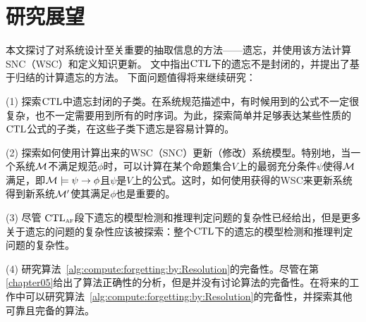 \section{研究展望}
本文探讨了对系统设计至关重要的抽取信息的方法——遗忘，并使用该方法计算SNC（WSC）和定义知识更新。
文中指出$\textrm{CTL}$下的遗忘不是封闭的，并提出了基于归结的计算遗忘的方法。
下面问题值得将来继续研究：

(1) 探索$\textrm{CTL}$中遗忘封闭的子类。在系统规范描述中，有时候用到的公式不一定很复杂，也不一定需要用到所有的时序词。为此，探索简单并足够表达某些性质的$\textrm{CTL}$公式的子类，在这些子类下遗忘是容易计算的。

(2) 探索如何使用计算出来的WSC（SNC）更新（修改）系统模型。特别地，当一个系统$\cal M$不满足规范$\phi$时，可以计算在某个命题集合$V$上的最弱充分条件$\psi$使得${\cal M}$满足，即${\cal M}\models\psi\rightarrow \phi$且$\psi$是$V$上的公式。这时，如何使用获得的WSC来更新系统得到新系统${\cal M}'$使其满足$\phi$也是重要的。


(3) 尽管 $\textrm{CTL}_{\textsc{a}\textsc{f}}$段下遗忘的模型检测和推理判定问题的复杂性已经给出，但是更多关于遗忘的问题的复杂性应该被探索：整个$\textrm{CTL}$下的遗忘的模型检测和推理判定问题的复杂性。

(4) 研究算法~\ref{alg:compute:forgetting:by:Resolution}的完备性。尽管在第\ref{chapter05}给出了算法正确性的分析，但是并没有讨论算法的完备性。在将来的工作中可以研究算法~\ref{alg:compute:forgetting:by:Resolution}的完备性，并探索其他可靠且完备的算法。

